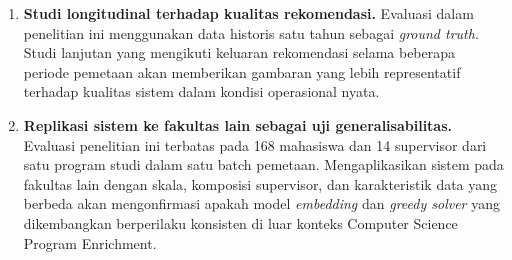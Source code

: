 \begin{enumerate}
    \item \textbf{Studi longitudinal terhadap kualitas rekomendasi.} Evaluasi dalam penelitian ini menggunakan data historis satu tahun sebagai \textit{ground truth}. Studi lanjutan yang mengikuti keluaran rekomendasi selama beberapa periode pemetaan akan memberikan gambaran yang lebih representatif terhadap kualitas sistem dalam kondisi operasional nyata.

    \item \textbf{Replikasi sistem ke fakultas lain sebagai uji generalisabilitas.} Evaluasi penelitian ini terbatas pada 168 mahasiswa dan 14 supervisor dari satu program studi dalam satu batch pemetaan. Mengaplikasikan sistem pada fakultas lain dengan skala, komposisi supervisor, dan karakteristik data yang berbeda akan mengonfirmasi apakah model \textit{embedding} dan \textit{greedy solver} yang dikembangkan berperilaku konsisten di luar konteks Computer Science Program Enrichment.
\end{enumerate}
